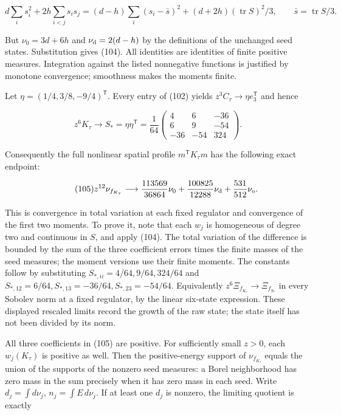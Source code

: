 \[
d\sum_i s_i^2+2h\sum_{i<j}s_is_j
 =(d-h)\sum_i(s_i-\bar s)^2+(d+2h)(\operatorname{tr}S)^2/3,
 \qquad\bar s=\operatorname{tr}S/3.
\]

But \(\nu_0=3d+6h\) and \(\nu_{\rm d}=2(d-h)\) by the definitions of the
unchanged seed states. Substitution gives (104). All identities are
identities of finite positive measures. Integration against the listed
nonnegative functions is justified by monotone convergence; smoothness
makes the moments finite.

Let \(\eta=(1/4,3/8,-9/4)^{\mathsf T}\). Every entry of (102) yields
\(z^3C_\tau\to\eta e_3^{\mathsf T}\) and hence

\[
z^6K_\tau\longrightarrow S_*=\eta\eta^{\mathsf T}
 =\frac1{64}\begin{pmatrix}4&6&-36\\6&9&-54\\-36&-54&324\end{pmatrix}.
\]

Consequently the full nonlinear spatial profile
\(m^{\mathsf T}K_\tau m\) has the following exact endpoint:

\[
\qquad\text{(105)}
 z^{12}\nu_{f_{K_\tau}}\longrightarrow
 \frac{113569}{36864}\nu_0+
 \frac{100825}{12288}\nu_{\rm d}+
 \frac{531}{512}\nu_{\rm o}.
\]

This is convergence in total variation at each fixed regulator and
convergence of the first two moments. To prove it, note that each
\(w_j\) is homogeneous of degree two and continuous in \(S\), and apply
(104). The total variation of the difference is bounded by the sum of
the three coefficient errors times the finite masses of the seed
measures; the moment versions use their finite moments. The constants
follow by substituting \(S_{*,ii}=4/64,9/64,324/64\) and
\(S_{*,12}=6/64,S_{*,13}=-36/64,S_{*,23}=-54/64\). Equivalently
\(z^6\Xi_{f_{K_\tau}}\to\Xi_{f_{S_*}}\) in every Sobolev norm at a fixed
regulator, by the linear six-state expression. These displayed rescaled
limits record the growth of the raw state; the state itself has not been
divided by its norm.

All three coefficients in (105) are positive. For sufficiently small
\(z>0\), each \(w_j(K_\tau)\) is positive as well. Then the
positive-energy support of \(\nu_{f_{K_\tau}}\) equals the union of the
supports of the nonzero seed measures: a Borel neighborhood has zero
mass in the sum precisely when it has zero mass in each seed. Write
\(d_j=\int d\nu_j\), \(n_j=\int E\,d\nu_j\). If at least one \(d_j\) is
nonzero, the limiting quotient is exactly


